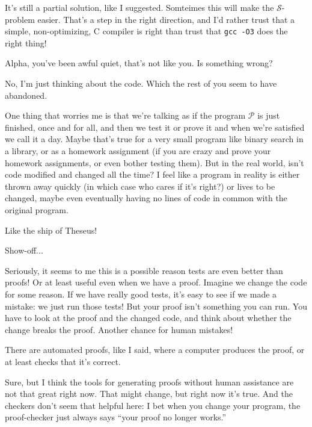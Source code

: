 \documentclass[sigplan]{acmart}
\begin{document}
   It's still a partial solution, like I
suggested. Somteimes this will make the $\mathcal{S}$-problem easier.
That's a step in the right direction, and I'd rather trust that a
simple, non-optimizing, C compiler is right than trust that {\tt gcc
  -O3} does the right thing!

  Alpha, you've been awful quiet, that's not
like you. Is something wrong?

  No, I'm just thinking about the code.
Which the rest of you seem to have abandoned.

  One thing that worries me is that we're
talking as if the program  $\mathcal{P}$ is just finished, once and
for all, and then we test it or prove it and when we're satisfied we
call it a day.  Maybe that's true for a very small program like binary
search in a library, or as a homework assignment (if you are crazy and
prove your homework assignments, or even bother testing them).  But in
the real world, isn't code modified and changed all the time?  I feel
like a program in reality is either thrown away quickly (in which case
who cares if it's right?) or lives to be changed, maybe even
eventually having no lines of code in common with the original program.

  Like the ship of Theseus!

 Show-off... 

  Seriously, it seems to me this is a possible reason
tests are even better than proofs!  Or at least useful even when we have a proof.
Imagine we change the code for some reason.  If we have really good tests, it's
easy to see if we made a mistake: we just run those tests!  But your
proof isn't something you can run.   You have to look at the proof and
the changed code, and think about whether the change breaks the
proof.  Another chance for human mistakes!

 There are automated proofs, like I said,
where a
computer produces the proof, or at least checks that it's correct.

 Sure, but I think the tools for generating
proofs without human assistance are not that great right now.  That
might change, but right now it's true.  And the checkers don't seem
that helpful here:  I bet when you change your program, the
proof-checker just always says ``your proof no longer works.''
\end{document}

